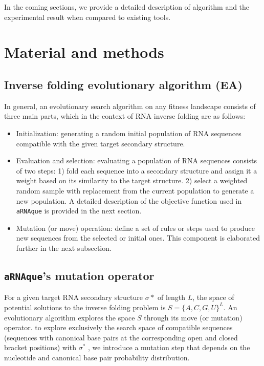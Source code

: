 In the coming sections, we provide a detailed description of  algorithm and the experimental result when compared to existing tools.

	
\section{Material and methods}

\subsection{Inverse folding evolutionary algorithm (EA)}
In general, an evolutionary search algorithm on any fitness landscape consists of three main parts, which in the context of RNA inverse folding are as follows: %
\begin{itemize}
	\item Initialization: generating a random initial population of RNA sequences compatible with the given target secondary structure.
	\item Evaluation and selection: evaluating a population of RNA sequences consists of two steps: 1) fold each sequence into a secondary structure and assign it a weight based on its similarity to the target structure. 2) select a weighted random sample with replacement from the current population to generate a new population. A detailed description of the objective function used in \texttt{aRNAque} is provided in the next section. 
	\item Mutation (or move) operation: define a set of rules or steps used to produce new sequences from the selected or initial ones. This component is elaborated further in the next subsection.
	
\end{itemize}


\subsection{\texttt{aRNAque}'s mutation operator}

For a given target RNA secondary structure $\sigma*$ of length $L$, the space of potential solutions to the inverse folding problem is $S=\{A,C,G,U\}^L$.
An evolutionary algorithm explores the space $S$ through its move (or mutation) operator. to explore exclusively the search space of compatible sequences (sequences with canonical base pairs at the corresponding open and closed bracket positions) with $\sigma^*$ , we introduce a mutation step that depends on the nucleotide and canonical base pair probability distribution.

